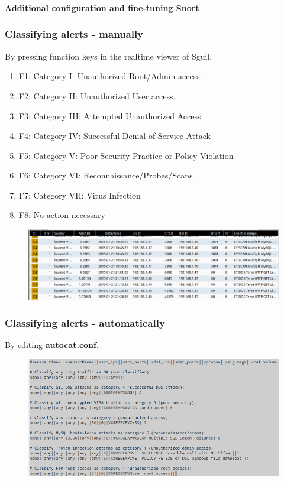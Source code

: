\documentclass{beamer}
\begin{document}
\begin{frame}
\frametitle{\insertsection}
\textbf{Additional configuration and fine-tuning Snort}
\end{frame}

\begin{frame}
\frametitle{Classifying alerts - manually}
By pressing function keys in the realtime viewer of Sguil.
\begin{enumerate}
\item F1: Category I: Unauthorized Root/Admin access.
\item F2: Category II: Unauthorized User access.
\item F3: Category III: Attempted Unauthorized Access
\item F4: Category IV: Successful Denial-of-Service Attack
\item F5: Category V: Poor Security Practice or Policy Violation
\item F6: Category VI: Reconnaissance/Probes/Scans
\item F7: Category VII: Virus Infection
\item F8: No action necessary
\end{enumerate}
\begin{figure}
   \includegraphics[width= 0.7\linewidth]{../images/VM_CAT_4.png}
\end{figure}
\end{frame}

\begin{frame}
\frametitle{Classifying alerts - automatically}
By editing \textbf{autocat.conf}.
\begin{figure}
   \includegraphics[width= 1\linewidth]{../images/VM_CAT_7.png}
\end{figure}
\end{frame}
\end{document}
